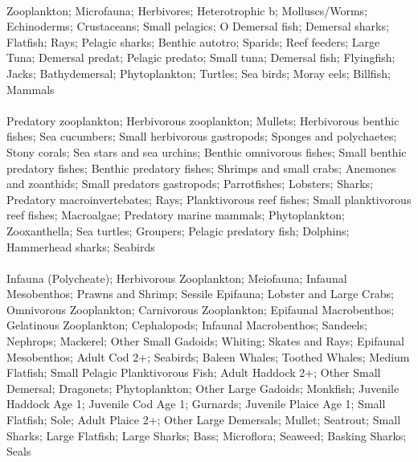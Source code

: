 \fullhline
\hline
{} \\
\hline
Zooplankton; Microfauna; Herbivores; Heterotrophic b; Molluscs/Worms; Echinoderms; Crustaceans; Small pelagics; O Demersal fish; Demersal sharks; Flatfish; Rays; Pelagic sharks; Benthic autotro; Sparids; Reef feeders; Large Tuna; Demersal predat; Pelagic predato; Small tuna; Demersal fish; Flyingfish; Jacks; Bathydemersal; Phytoplankton; Turtles; Sea birds; Moray eels; Billfish; Mammals\\
\fullhline
\hline
{} \\
\hline
Predatory zooplankton; Herbivorous zooplankton; Mullets; Herbivorous benthic fishes; Sea cucumbers; Small herbivorous gastropods; Sponges and polychaetes; Stony corals; Sea stars and sea urchins; Benthic omnivorous fishes; Small benthic predatory fishes; Benthic predatory fishes; Shrimps and small crabs; Anemones and zoanthids; Small predators gastropods; Parrotfishes; Lobsters; Sharks; Predatory macroinvertebates; Rays; Planktivorous reef fishes; Small planktivorous reef fishes; Macroalgae; Predatory marine mammals; Phytoplankton; Zooxanthella; Sea turtles; Groupers; Pelagic predatory fish; Dolphins; Hammerhead sharks; Seabirds\\
\fullhline
\hline
{} \\
\hline
Infauna (Polycheate); Herbivorous Zooplankton; Meiofauna; Infaunal Mesobenthos; Prawns and Shrimp; Sessile Epifauna; Lobster and Large Crabs; Omnivorous Zooplankton; Carnivorous Zooplankton; Epifaunal Macrobenthos; Gelatinous Zooplankton; Cephalopods; Infaunal Macrobenthos; Sandeels; Nephrops; Mackerel; Other Small Gadoids; Whiting; Skates and Rays; Epifaunal Mesobenthos; Adult Cod 2+; Seabirds; Baleen Whales; Toothed Whales; Medium Flatfish; Small Pelagic Planktivorous Fish; Adult Haddock 2+; Other Small Demersal; Dragonets; Phytoplankton; Other Large Gadoids; Monkfish; Juvenile Haddock Age 1; Juvenile Cod Age 1; Gurnards; Juvenile Plaice Age 1; Small Flatfish; Sole; Adult Plaice 2+; Other Large Demersals; Mullet; Seatrout; Small Sharks; Large Flatfish; Large Sharks; Bass; Microflora; Seaweed; Basking Sharks; Seals\\
\fullhline
\hline
{} \\
\hline
